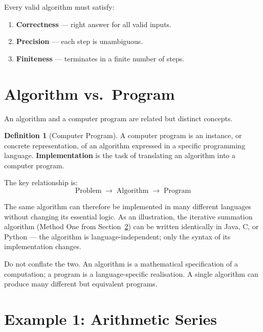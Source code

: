 \documentclass[11pt, a4paper, notitlepage]{report}
\theoremstyle{definition}
\newtheorem{definition}[theorem]{Definition}
\theoremstyle{remark}
\theoremstyle{definition}
\begin{document}
\begin{keyresult}[title={Core Properties of an Algorithm}]
Every valid algorithm must satisfy:
\begin{enumerate}
  \item \textbf{Correctness} --- right answer for all valid inputs.
  \item \textbf{Precision} --- each step is unambiguous.
  \item \textbf{Finiteness} --- terminates in a finite number of steps.
\end{enumerate}
\end{keyresult}

\section{Algorithm vs.\ Program}
\label{sec:algorithm-vs-program}

An algorithm and a computer program are related but distinct concepts.

\begin{definition}[Computer Program]
\label{def:program}
A computer program is an instance, or concrete representation, of an algorithm expressed in a
specific programming language.  \textbf{Implementation} is the task of translating an algorithm
into a computer program.
\end{definition}

The key relationship is:
\[
  \text{Problem} \;\longrightarrow\; \text{Algorithm} \;\longrightarrow\; \text{Program}
\]

The same algorithm can therefore be implemented in many different languages without changing its
essential logic. As an illustration, the iterative summation algorithm (Method One from
Section~\ref{sec:arithmetic-series}) can be written identically in Java, C, or Python ---
the algorithm is language-independent; only the syntax of its implementation changes.

\begin{examtip}[title={Exam Tip: Algorithm $\neq$ Program}]
Do not conflate the two. An algorithm is a mathematical specification of a computation; a
program is a language-specific realisation. A single algorithm can produce many different but
equivalent programs.
\end{examtip}

\section{Example 1: Arithmetic Series}
\label{sec:arithmetic-series}
\end{document}
